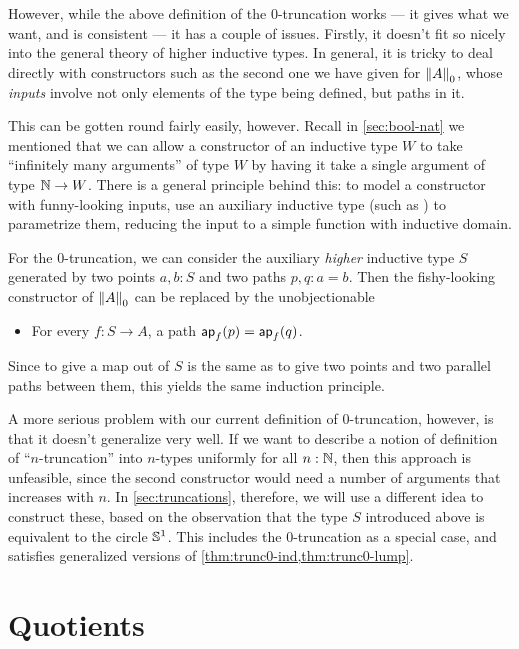However, while the above definition of the 0-truncation works --- it gives what we want, and is consistent --- it has a couple of issues.
Firstly, it doesn't fit so nicely into the general theory of higher inductive types.
In general, it is tricky to deal directly with constructors such as the second one we have given for $\trunc0A$, whose \emph{inputs} involve not only elements of the type being defined, but paths in it.

This can be gotten round fairly easily, however.
Recall in \autoref{sec:bool-nat} we mentioned that we can allow a constructor of an inductive type $W$ to take ``infinitely many arguments'' of type $W$ by having it take a single argument of type $\nat\to W$.
There is a general principle behind this: to model a constructor with funny-looking inputs, use an auxiliary inductive type (such as \nat) to parametrize them, reducing the input to a simple function with inductive domain.

For the 0-truncation, we can consider the auxiliary \emph{higher} inductive type $S$ generated by two points $a,b:S$ and two paths $p,q:a=b$.
Then the fishy-looking constructor of $\trunc 0A$ can be replaced by the unobjectionable
\begin{itemize}
\item For every $f:S\to A$, a path $\apfunc{f}(p) = \apfunc{f}(q)$.
\end{itemize}
Since to give a map out of $S$ is the same as to give two points and two parallel paths between them, this yields the same induction principle.

A more serious problem with our current definition of $0$-truncation, however, is that it doesn't generalize very well.
If we want to describe a notion of definition of ``$n$-truncation'' into $n$-types uniformly for all $n:\nat$, then this approach is unfeasible, since the second constructor would need a number of arguments that increases with $n$.
In \autoref{sec:truncations}, therefore, we will use a different idea to construct these, based on the observation that the type $S$ introduced above is equivalent to the circle $\Sn^1$.
This includes the 0-truncation as a special case, and satisfies generalized versions of \autoref{thm:trunc0-ind,thm:trunc0-lump}.


\section{Quotients}
\label{sec:set-quotients}

